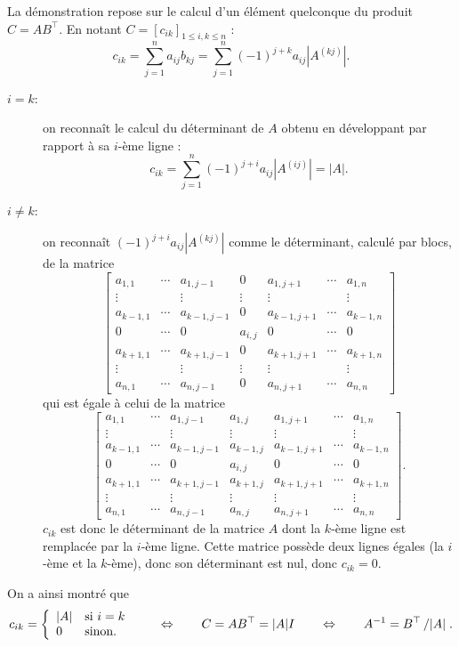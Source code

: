 \proof
La démonstration repose sur le calcul d'un élément quelconque du produit $C = A B^\top$. En notant $C = [c_{ik}]_{1 \leq i, k \leq n}$ : 
$$
c_{ik} 
= \sum_{j=1}^n a_{ij} b_{kj} 
= \sum_{j=1}^n (-1)^{j+k} a_{ij} |A^{(kj)}|.
$$
\begin{description}
  \item[$i = k$:] on reconnaît le calcul du déterminant de $A$ obtenu en développant par rapport à sa $i$-ème ligne : 
  $$
  c_{ik} 
  = \sum_{j=1}^n (-1)^{j+i} a_{ij} |A^{(ij)}|
  = |A|.
  $$
  \item[$i \neq k$:] on reconnaît $(-1)^{j+i} a_{ij} |A^{(kj)}|$ comme le déterminant, calculé par blocs, de la matrice
  $$
  \left[\begin{array}{ccccccc}
         a_{1, 1} & \cdots & a_{1,j-1} & 0 & a_{1, j+1} & \cdots & a_{1, n} \\
         \vdots & & \vdots & \vdots & \vdots &  & \vdots \\
         a_{k-1,1} & \cdots & a_{k-1,j-1} & 0 & a_{k-1, j+1} & \cdots & a_{k-1, n} \\
         0 & \cdots & 0 & a_{i, j} & 0 & \cdots & 0 \\
         a_{k+1,1} & \cdots & a_{k+1,j-1} & 0 & a_{k+1, j+1} & \cdots & a_{k+1, n} \\
         \vdots & & \vdots & \vdots & \vdots &  & \vdots \\
         a_{n, 1} & \cdots & a_{n,j-1} & 0 & a_{n, j+1} & \cdots & a_{n, n} 
        \end{array}\right]
  $$
  qui est égale à celui de la matrice
  $$
  \left[\begin{array}{ccccccc}
         a_{1, 1} & \cdots & a_{1,j-1} & a_{1, j} & a_{1, j+1} & \cdots & a_{1, n} \\
         \vdots & & \vdots & \vdots & \vdots &  & \vdots \\
         a_{k-1,1} & \cdots & a_{k-1,j-1} & a_{k-1, j} & a_{k-1, j+1} & \cdots & a_{k-1, n} \\
         0 & \cdots & 0 & a_{i, j} & 0 & \cdots & 0 \\
         a_{k+1,1} & \cdots & a_{k+1,j-1} & a_{k+1, j} & a_{k+1, j+1} & \cdots & a_{k+1, n} \\
         \vdots & & \vdots & \vdots & \vdots &  & \vdots \\
         a_{n, 1} & \cdots & a_{n,j-1} & a_{n, j} & a_{n, j+1} & \cdots & a_{n, n} 
        \end{array}\right].
  $$
  $c_{ik}$ est donc le déterminant de la matrice $A$ dont la $k$-ème ligne est remplacée par la $i$-ème ligne. 
  Cette matrice possède deux lignes égales (la $i$-ème et la $k$-ème), donc son déterminant est nul, donc $c_{ik} = 0$.
\end{description}
On a ainsi montré que
$$
c_{ik} = \left\{\begin{array}{ll} 
                  |A| & \text{si $i = k$} \\
                  0 & \text{sinon}.
                \end{array} \right.
\qquad \Leftrightarrow \qquad
C = AB^\top = |A| I
\qquad \Leftrightarrow \qquad
A^{-1} = B^\top \left/|A|\right..
$$
\eproof
